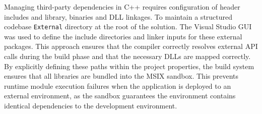 Managing third-party dependencies in C++ requires configuration of header includes and library, binaries and DLL linkages. To maintain a structured codebase \texttt{External} directory at the root of the solution. The Visual Studio GUI was used to define the include directories and linker inputs for these external packages. This approach ensures that the compiler correctly resolves external API calls during the build phase and that the necessary DLLs are mapped correctly. By explicitly defining these paths within the project properties, the build system ensures that all libraries are bundled into the MSIX sandbox. This prevents runtime module execution failures when the application is deployed to an external environment, as the sandbox guarantees the environment contains identical dependencies to the development environment.








